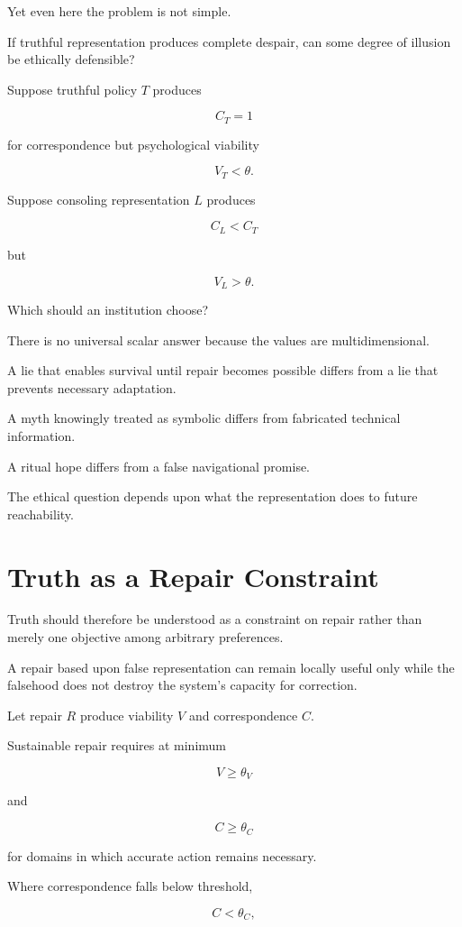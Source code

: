 \documentclass[11pt,oneside]{book}
\theoremstyle{definition}
\theoremstyle{remark}
\begin{document}
Yet even here the problem is not simple.

If truthful representation produces complete despair, can some degree of illusion be ethically defensible?

Suppose truthful policy \(T\) produces

\[
C_T=1
\]

for correspondence but psychological viability

\[
V_T<\theta.
\]

Suppose consoling representation \(L\) produces

\[
C_L<C_T
\]

but

\[
V_L>\theta.
\]

Which should an institution choose?

There is no universal scalar answer because the values are multidimensional.

A lie that enables survival until repair becomes possible differs from a lie that prevents necessary adaptation.

A myth knowingly treated as symbolic differs from fabricated technical information.

A ritual hope differs from a false navigational promise.

The ethical question depends upon what the representation does to future reachability.

\section{Truth as a Repair Constraint}

Truth should therefore be understood as a constraint on repair rather than merely one objective among arbitrary preferences.

A repair based upon false representation can remain locally useful only while the falsehood does not destroy the system's capacity for correction.

Let repair \(R\) produce viability \(V\) and correspondence \(C\).

Sustainable repair requires at minimum

\[
V\geq\theta_V
\]

and

\[
C\geq\theta_C
\]

for domains in which accurate action remains necessary.

Where correspondence falls below threshold,

\[
C<\theta_C,
\]
\end{document}
